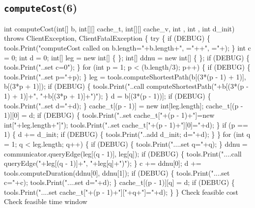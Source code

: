 \subsection{\texttt{computeCost}(6)}
\nwenddocs{}\endmoddef\nwstartdeflinemarkup{}\nwenddeflinemarkup
int computeCost(int[] b, int[][] cache_t, int[][] cache_v, int , int , int d_init)
throws ClientException, ClientFatalException \{
  try \{
    if (DEBUG) \{
      tools.Print("computeCost called on b.length="+b.length+", ="++", ="+);
    \}
    int c = 0;
    int d = 0;
    int[] leg = new int[] \{ \};
    int[] ddnu = new int[] \{ \};
    if (DEBUG) \{
      tools.Print("..set c=0");
    \}
    for (int p = 1; p < (b.length/3); p++) \{
      if (DEBUG) \{
        tools.Print("..set p="+p);
      \}
      leg = tools.computeShortestPath(b[(3*(p - 1) + 1)], b[(3*p + 1)]);
      if (DEBUG) \{
        tools.Print("..call computeShortestPath("+b[(3*(p - 1) + 1)]+", "+b[(3*p + 1)]+")");
      \}
      d = b[(3*(p - 1))];
      if (DEBUG) \{
        tools.Print("..set d="+d);
      \}
      cache_t[(p - 1)] = new int[leg.length];
      cache_t[(p - 1)][0] = d;
      if (DEBUG) \{
        tools.Print("..set cache_t["+(p - 1)+"]=new int["+leg.length+"]");
        tools.Print("..set cache_t["+(p - 1)+"][0]="+d);
      \}
      if (p == 1) \{
        d += d_init;
        if (DEBUG) \{
          tools.Print("..add d_init; d="+d);
        \}
      \}
      for (int q = 1; q < leg.length; q++) \{
        if (DEBUG) \{
          tools.Print("....set q="+q);
        \}
        ddnu = communicator.queryEdge(leg[(q - 1)], leg[q]);
        if (DEBUG) \{
          tools.Print("....call queryEdge("+leg[(q - 1)]+", "+leg[q]+")");
        \}
        c += ddnu[0];
        d += tools.computeDuration(ddnu[0], ddnu[1]);
        if (DEBUG) \{
          tools.Print("....set c="+c);
          tools.Print("....set d="+d);
        \}
        cache_t[(p - 1)][q] = d;
        if (DEBUG) \{
          tools.Print("....set cache_t["+(p - 1)+"]["+q+"]="+d);
        \}
      \}
      \LA{}Check feasible cost~{\nwtagstyle{}}\RA{}
      \LA{}Check feasible time window~{\nwtagstyle{}}\RA{}
